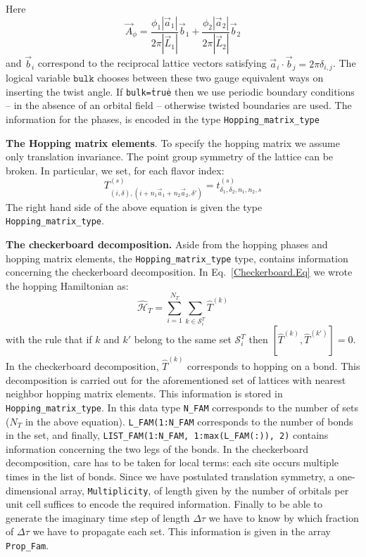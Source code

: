 Here 
\begin{equation}
	\vec{A}_{\phi} =\frac{  \phi_1  |\vec{a}_1|} { 2 \pi |\vec{L}_1| } \vec{b}_1 +  \frac{  \phi_2  |\vec{a}_2|}{2 \pi  |\vec{L}_2| } \vec{b}_2
\end{equation}
and $\vec{b}_i$  correspond to the reciprocal lattice vectors satisfying  $ \vec{a}_i  \cdot  \vec{b}_j  = 2 \pi \delta_{i,j} $.   The logical variable $\texttt{bulk} $ chooses between these two  gauge equivalent ways  on inserting the twist angle. If \texttt{bulk=\.true\.}    then  we use periodic boundary conditions  --  in the absence of an orbital field -- otherwise  twisted boundaries are used.  
The information for the phases,    is encoded in  the type \texttt{Hopping\_matrix\_type} 

\noindent
\textbf{The  Hopping matrix elements}. 
To specify the hopping matrix  we  assume  only translation invariance.  The point group symmetry of the lattice can be broken.   In particular, we set, for each flavor  index:
\begin{equation} 
	 T_{(i,\delta), (i +  n_1\vec{a}_1  + n_2 \vec{a}_2,\delta')}^{(s)}   =   t^{(s)}_{\delta_1,\delta_2,n_1,n_2, s}
\end{equation}
The right  hand side of the above equation is given  the type  \texttt{Hopping\_matrix\_type}.


\noindent
\textbf{The checkerboard decomposition.}   Aside from the hopping phases and hopping matrix elements, the \texttt{Hopping\_matrix\_type} type, contains information  concerning the checkerboard   decomposition.  In Eq.~\ref{Checkerboard.Eq} we wrote the hopping Hamiltonian as:
\begin{equation}
	\hat{\mathcal{H}}_{T}     = \sum_{i=1}^{N_T} \sum_{k \in \mathcal{S}^{T}_i} \hat{T}^{(k)}   
\end{equation}
with the rule that  if $k$ and $k'$  belong to the same set $\mathcal{S}^{T}_i $ then   $ \left[ \hat{T}^{(k)} , \hat{T}^{(k')} \right] = 0 $.  In the checkerboard decomposition, $\hat{T}^{(k)}$   corresponds to  hopping on a bond.   This decomposition is carried out for the aforementioned set of lattices with nearest neighbor  hopping matrix elements.  This information is stored in  \texttt{Hopping\_matrix\_type}. In this data type  \texttt{N\_FAM}  corresponds to the number of sets  ($N_T$ in the above equation). \texttt{L\_FAM(1:N\_FAM}   corresponds to the number of bonds in the set,  and finally, 
 \texttt{LIST\_FAM(1:N\_FAM, 1:max(L\_FAM(:)), 2)}    contains  information concerning the two legs of the bonds.    In the checkerboard decomposition, care has to be taken for local terms: each site  occurs multiple times in the list of bonds.    Since we have postulated translation symmetry,    a one-dimensional array, \texttt{Multiplicity},  of length  given by  the number of orbitals per unit cell suffices to  encode the required information.  
 Finally to be able to generate  the imaginary time step of length $\Delta \tau$  we  have to know   by which fraction of  $\Delta \tau$   we have to propagate each set.  This information is given in  the array  \texttt{Prop\_Fam}.  
 

